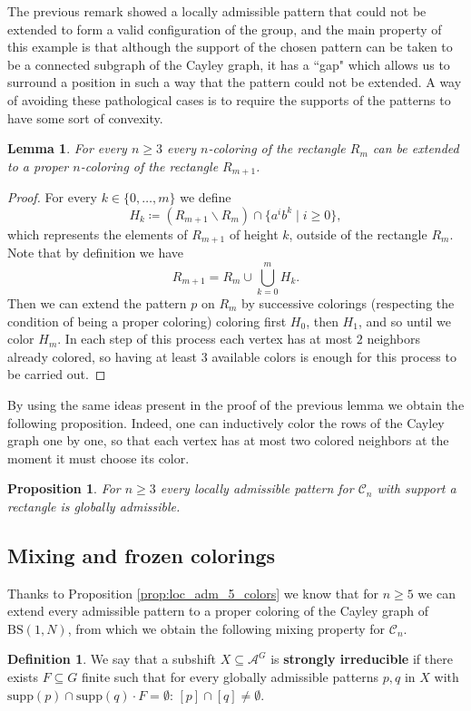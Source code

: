 \documentclass{aims}
\newcommand{\BS}[1][N]{\mathrm{BS}(1,#1)}
\newtheorem{lemma}[theorem]{Lemma}
\newtheorem{proposition}{Proposition}
\theoremstyle{definition}
\newtheorem{definition}[theorem]{Definition}
\begin{document}
The previous remark showed a locally admissible pattern that could not be extended to form a valid configuration of the group, and the main property of this example is that although the support of the chosen pattern can be taken to be a connected subgraph of the Cayley graph, it has a ``gap" which allows us to surround a position in such a way that the pattern could not be extended. A way of avoiding these pathological cases is to require the supports of the patterns to have some sort of convexity.
\begin{lemma} \label{lem:gcs_extend_to_rectangles} For every $n\ge 3$ every $n$-coloring of the rectangle $R_m$ can be extended to a proper $n$-coloring of the rectangle $R_{m+1}$.
\end{lemma}
\begin{proof}
	For every $k\in \{0,\ldots,m\}$ we define $$H_k\coloneqq \left(R_{m+1}\backslash R_{m}\right)\cap \{a^ib^k\mid i\ge 0\},$$
	which represents the elements of $R_{m+1}$ of height $k$, outside of the rectangle $R_m$. Note that by definition we have $$R_{m+1}=R_m\cup \bigcup_{k=0}^{m}H_k.$$ Then we can extend the pattern $p$ on $R_m$ by successive colorings (respecting the condition of being a proper coloring) coloring first $H_0$, then $H_1$, and so until we color $H_m$. In each step of this process each vertex has at most $2$ neighbors already colored, so having at least $3$ available colors is enough for this process to be carried out. 
\end{proof}
By using the same ideas present in the proof of the previous lemma we obtain the following proposition. Indeed, one can inductively color the rows of the Cayley graph one by one, so that each vertex has at most two colored neighbors at the moment it must choose its color. 
\begin{proposition}\label{prop:gcs_rectangle_extension} For $n\ge 3$ every locally admissible pattern for $\mathcal{C}_n$ with support a rectangle is globally admissible.
\end{proposition}



\subsection{Mixing and frozen colorings}\label{subsection:mixing_and frozen}
Thanks to Proposition \ref{prop:loc_adm_5_colors} we know that for $n\ge 5$ we can extend every admissible pattern to a proper coloring of the Cayley graph of $\BS$, from which we obtain the following mixing property for $\mathcal{C}_n$.
\begin{definition} We say that a subshift $X\subseteq \mathcal{A}^G$ is \textbf{strongly irreducible} if there exists $F\subseteq G$ finite such that for every globally admissible patterns $p,q$ in $X$ with $\mathrm{supp}(p)\cap \mathrm{supp}(q)\cdot F=\emptyset$: $[p]\cap [q]\neq \emptyset$.
\end{definition}
\end{document}
